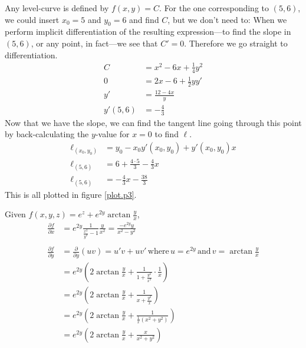 \documentclass[a4paper,norsk,12pt]{article}
\begin{document}
Any level-curve is defined by $f(x,y)=C$. For the one corresponding to $(5,6)$,
we could insert $x_0=5$ and $y_0=6$ and find $C$, but we don't need to: When we
perform implicit differentiation of the resulting expression---to find the
slope in $(5,6)$, or any point, in fact---we see that $C'=0$. Therefore we go
straight to differentiation.
\begin{align*}
  C &= x^2 - 6x + \frac{1}{4}y^2 \\
  0 &= 2x - 6 + \frac{1}{2}yy' \\
  y' &= \frac{12-4x}{y} \\
  y'(5,6) &= -\frac{4}{3}
\end{align*}
Now that we have the slope, we can find the tangent line going through this
point by back-calculating the $y$-value for $x=0$ to find $\ell$.
\begin{align*}
  \ell_{(x_0, y_0)} &= y_0 - x_0y'(x_0,y_0) + y'(x_0,y_0)x \\
  \ell_{(5,6)} &= 6+\frac{4\cdot5}{3} -\frac{4}{3}x \\
  \ell_{(5,6)} &= -\frac{4}{3}x -\frac{38}{3}
\end{align*}
This is all plotted in figure \vref{plot.p3}.

Given $f(x,y,z) = e^z + e^{2y}\arctan{\frac{y}{x}}$,
\begin{align*}
  \frac{\partial f}{\partial x} &=
    e^{2y}\frac{1}{\frac{x^2}{y^2}-1}\frac{y}{x^2} = \frac{-e^{2y}y}{x^2-y^2} \\
    \\
    \frac{\partial f}{\partial y} &= \frac{\partial}{\partial y}(uv) =
    u'v+uv' \,\text{where}\, u=e^{2y} \,\text{and}\, v=\arctan{\frac{y}{x}} \\
    &= e^{2y}\left( 2\arctan{\frac{y}{x}} + \frac{1}{1+\frac{y^2}{x^2}}\cdot\frac{1}{x}\right) \\
    &= e^{2y}\left( 2\arctan{\frac{y}{x}} + \frac{1}{x+\frac{y^2}{x}}\right) \\
    &= e^{2y}\left( 2\arctan{\frac{y}{x}} + \frac{1}{\frac{1}{x}(x^2+y^2)}\right) \\
    &= e^{2y}\left( 2\arctan{\frac{y}{x}} + \frac{x}{x^2+y^2} \right) \\
\end{align*}




\end{document}

